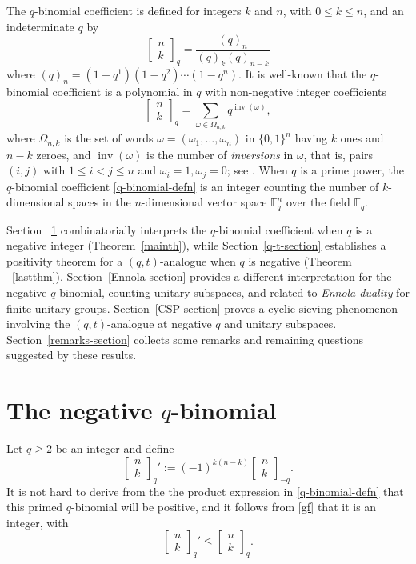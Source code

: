 \documentclass[10pt]{amsart}
\theoremstyle{plain}
\theoremstyle{definition}
\theoremstyle{remark}
\numberwithin{equation}{section}
\newcommand\qbin[3]{\left[\begin{matrix} #1 \\ #2 \end{matrix} \right]_{#3}}
\newcommand\inv{\operatorname{inv}}
\newcommand\FF{\mathbb{F}}
\begin{document}
 The $q$-binomial coefficient is defined for
integers $k$ and $n$, with $0\le k\le n$, and an indeterminate $q$ by
\begin{equation}
\label{q-binomial-defn}
\qbin{n}{k}{q}=
\frac{(q)_n}{(q)_k(q)_{n-k}}
\end{equation}
where $(q)_n=(1-q^1)(1-q^2)\cdots(1-q^n)$.
It is well-known \cite[p. 39]{A} that the 
$q$-binomial coefficient is a polynomial in
$q$ with non-negative integer coefficients
\begin{equation}
\label{gf}
\qbin{n}{k}{q}=\sum_{\omega\in \Omega_{n,k}} q^{\inv(\omega)},
\end{equation}
where 
$\Omega_{n,k}$ is the set of words 
$\omega=(\omega_1,\ldots,\omega_n)$ in $\{0,1\}^n$
having $k$ ones and $n-k$ zeroes, 
and $\inv(\omega)$ is the number of {\it inversions} in $\omega$, 
that is, pairs $(i,j)$ with $1 \leq i < j \leq n$ and
$\omega_i=1, \omega_j=0$; see \cite[p. 40]{A}.
When $q$ is a prime power, the $q$-binomial coefficient 
\eqref{q-binomial-defn} is an integer
counting the number of  $k$-dimensional spaces in the $n$-dimensional vector space
$\FF_q^n$ over the field $\FF_q$. 

Section ~\ref{definition-section} combinatorially
interprets the $q$-binomial coefficient when $q$ is a 
negative integer (Theorem~\ref{mainth}),
while Section~\ref{q-t-section} establishes a 
positivity theorem for a $(q,t)$-analogue when $q$ is negative 
(Theorem ~\ref{lastthm}).  Section~\ref{Ennola-section}
provides a different interpretation for the negative $q$-binomial,
counting unitary subspaces, and related to {\it Ennola duality} for
finite unitary groups.  Section~\ref{CSP-section} 
proves a cyclic sieving phenomenon
involving the $(q,t)$-analogue at negative $q$ and unitary subspaces. 
Section~\ref{remarks-section} collects some
remarks and remaining questions suggested by these results.



\section{The negative $q$-binomial}
\label{definition-section}

Let $q\ge2$ be an integer and define
\begin{equation}
\label{negative-q-binomial-definition}
\qbin{n}{k}{q}':=(-1)^{k(n-k)}\qbin{n}{k}{-q}.
\end{equation}
\noindent
It is not hard to derive from the
the product expression in \eqref{q-binomial-defn} that this 
primed $q$-binomial will be positive, and it follows
from \eqref{gf} that it is an integer, with
\begin{equation}
\label{ineq}
\qbin{n}{k}{q}'\le \qbin{n}{k}{q}.
\end{equation}
\end{document}
